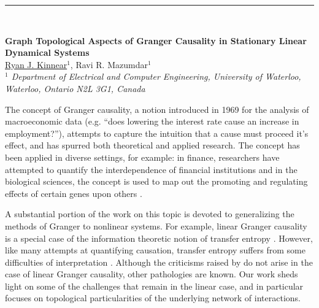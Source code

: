 \documentclass[12pt]{article}
\begin{document}
\hspace{-0.70cm}\rule{17.5cm}{0.01 in} \\
\vspace{-0.4cm}
\begin{flushleft}
  \Large \textbf{\noindent Graph Topological Aspects of Granger
    Causality in Stationary Linear Dynamical Systems}
\\
\vspace{0.5cm}
\normalsize
\normalsize{
 \underline{Ryan J. Kinnear}$^1$, Ravi R. Mazumdar$^1$
} \\
\vspace{5mm}
\textit{\footnotesize
$^1$ Department of Electrical and Computer Engineering, University of Waterloo, Waterloo, Ontario N2L 3G1, Canada\\
}
\end{flushleft}

The concept of Granger causality, a notion introduced in 1969
\cite{granger1969investigating} for the analysis of macroeconomic data
(e.g. ``does lowering the interest rate cause an increase in
employment?''), attempts to capture the intuition that a cause must
proceed it's effect, and has spurred both theoretical and applied
research.  The concept has been applied in diverse settings, for
example: in finance, researchers have attempted to quantify the
interdependence of financial institutions \cite{NBERw16223} and in the
biological sciences, the concept is used to map out the promoting and
regulating effects of certain genes upon others
\cite{methods_for_inferring_gene_regulatory_networks_from_time_series_expression_data}.

A substantial portion of the work on this topic is devoted to
generalizing the methods of Granger to nonlinear systems.  For
example, linear Granger causality is a special case of the information
theoretic notion of transfer entropy \cite{barnett2009granger}.
However, like many attempts at quantifying causation, transfer entropy
suffers from some difficulties of interpretation
\cite{transfer_entropy_criticism}.  Although the criticisms raised by
\cite{transfer_entropy_criticism} do not arise in the case of linear
Granger causality, other pathologies are known.  Our work sheds light
on some of the challenges that remain in the linear case, and in
particular focuses on topological particularities of the underlying
network of interactions.
\end{document}
